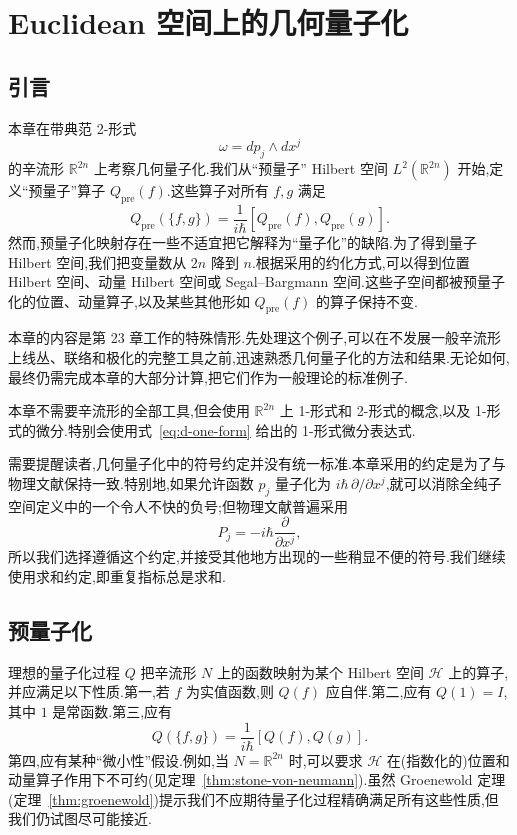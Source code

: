 \chapter{Euclidean 空间上的几何量子化}
\label{chap:geometric-quantization-euclidean}

\section{引言}
\label{sec:geometric-quantization-euclidean-intro}

本章在带典范 2-形式
\[
 \omega=dp_j\wedge dx^j
\]
的辛流形 $\mathbb R^{2n}$ 上考察几何量子化.我们从“预量子” Hilbert 空间 $L^2(\mathbb R^{2n})$ 开始,定义“预量子”算子 $Q_{\mathrm{pre}}(f)$.这些算子对所有 $f,g$ 满足
\[
 Q_{\mathrm{pre}}(\{f,g\})
 =\frac1{i\hbar}[Q_{\mathrm{pre}}(f),Q_{\mathrm{pre}}(g)].
\]
然而,预量子化映射存在一些不适宜把它解释为“量子化”的缺陷.为了得到量子 Hilbert 空间,我们把变量数从 $2n$ 降到 $n$.根据采用的约化方式,可以得到位置 Hilbert 空间、动量 Hilbert 空间或 Segal--Bargmann 空间.这些子空间都被预量子化的位置、动量算子,以及某些其他形如 $Q_{\mathrm{pre}}(f)$ 的算子保持不变.

本章的内容是第 23 章工作的特殊情形.先处理这个例子,可以在不发展一般辛流形上线丛、联络和极化的完整工具之前,迅速熟悉几何量子化的方法和结果.无论如何,最终仍需完成本章的大部分计算,把它们作为一般理论的标准例子.

本章不需要辛流形的全部工具,但会使用 $\mathbb R^{2n}$ 上 1-形式和 2-形式的概念,以及 1-形式的微分.特别会使用式~\eqref{eq:d-one-form} 给出的 1-形式微分表达式.

需要提醒读者,几何量子化中的符号约定并没有统一标准.本章采用的约定是为了与物理文献保持一致.特别地,如果允许函数 $p_j$ 量子化为 $i\hbar\,\partial/\partial x^j$,就可以消除全纯子空间定义中的一个令人不快的负号;但物理文献普遍采用
\[
 P_j=-i\hbar\frac{\partial}{\partial x^j},
\]
所以我们选择遵循这个约定,并接受其他地方出现的一些稍显不便的符号.我们继续使用求和约定,即重复指标总是求和.

\section{预量子化}
\label{sec:prequantization}

理想的量子化过程 $Q$ 把辛流形 $N$ 上的函数映射为某个 Hilbert 空间 $\mathcal H$ 上的算子,并应满足以下性质.第一,若 $f$ 为实值函数,则 $Q(f)$ 应自伴.第二,应有 $Q(1)=I$,其中 $1$ 是常函数.第三,应有
\[
 Q(\{f,g\})=\frac1{i\hbar}[Q(f),Q(g)].
\]
第四,应有某种“微小性”假设.例如,当 $N=\mathbb R^{2n}$ 时,可以要求 $\mathcal H$ 在(指数化的)位置和动量算子作用下不可约(见定理~\ref{thm:stone-von-neumann}).虽然 Groenewold 定理(定理~\ref{thm:groenewold})提示我们不应期待量子化过程精确满足所有这些性质,但我们仍试图尽可能接近.

